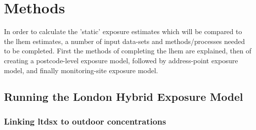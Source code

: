 \section{Methods}
\label{sec:2methods}

In order to calculate the 'static' exposure estimates which will be compared to the \gls{lhem} estimates, a number of input data-sets and methods/processes needed to be completed. First the methods of completing the \gls{lhem} are explained, then of creating a postcode-level exposure model, followed by address-point exposure model, and finally monitoring-site exposure model.

    \subsection{Running the London Hybrid Exposure Model}
    \label{sec:running_the_lhem}

        \subsubsection{Linking ltdsx to outdoor concentrations}
        \label{sec:linking_ltdsx_to_cmaq}

